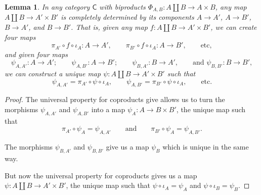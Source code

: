 \documentclass[a4paper,10pt]{scrreprt}
\theoremstyle{definition}
\theoremstyle{plain}
\newtheorem{lemma}{Lemma}[section]
\theoremstyle{remark}
\begin{document}
\begin{lemma}
  \label{lemma:mapcoprodtoproddeterminedbycomponents}
  In any category $\mathsf{C}$ with biproducts $\Phi_{A, B}\colon A \amalg B \to A \times B$, any map $A \amalg B \to A' \times B'$ is completely determined by its components $A \to A'$, $A \to B'$, $B \to A'$, and $B \to B'$. That is, given any map $f\colon A \amalg B \to A' \times B'$, we can create four maps
  \begin{equation*}
    \pi_{A'} \circ f \circ \iota_{A}\colon A \to A', \qquad \pi_{B'} \circ f \circ \iota_{A}\colon A \to B',\qquad\text{etc},
  \end{equation*}
  and given four maps
  \begin{equation*}
    \psi_{A, A'}\colon A \to A';\qquad \psi_{A, B'}\colon A \to B';\qquad \psi_{B,A'}\colon B \to A',\qquad\text{and } \psi_{B,B'}\colon B \to B',
  \end{equation*}
  we can construct a unique map $\psi\colon A \amalg B \to A' \times B'$ such that
  \begin{equation*}
    \psi_{A, A'} = \pi_{A'} \circ \psi \circ \iota_{A},\qquad \psi_{A,B'} = \pi_{B'} \circ \psi \circ \iota_{A},\qquad\text{etc}.
  \end{equation*}
\end{lemma}
\begin{proof}
  The universal property for coproducts give allows us to turn the morphisms $\psi_{A,A'}$ and $\psi_{A, B'}$ into a map $\psi_{A}\colon A \to B \times B'$, the unique map such that 
  \begin{equation*}
    \pi_{A'} \circ \psi_{A} = \psi_{A,A'} \qquad\text{and}\qquad\pi_{B'} \circ \psi_{A} = \psi_{A,B'}.
  \end{equation*}

  The morphisms $\psi_{B,A'}$ and $\psi_{B,B'}$ give us a map $\psi_{B}$ which is unique in the same way.

  But now the universal property for coproducts gives us a map $\psi\colon A \amalg B \to A' \times B'$, the unique map such that $\psi \circ \iota_{A} = \psi_{A}$ and $\psi \circ \iota_{B} = \psi_{B}$.
\end{proof}
\end{document}
